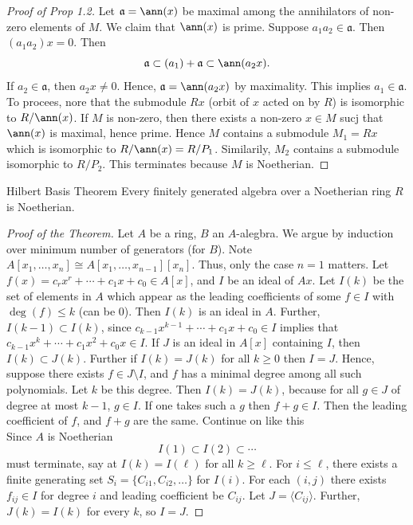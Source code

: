 \documentclass[twoside, openright, fontsize=10pt, headings=big]{scrbook}
\begin{document}
\begin{proof}[Proof of Prop 1.2]
    Let $\mathfrak{a}=\ann(x)$ be maximal among the annihilators of non-zero elements of $M$. We claim that $\ann(x)$ is prime. Suppose $a_1a_2\in\mathfrak{a}$. Then $(a_1a_2)x=0$. Then 
    \[
        \mathfrak{a}\subset(a_1)+\mathfrak{a}\subset \ann(a_2x).
    \]
    If $a_2\in\mathfrak{a}$, then $a_2x\neq0$. Hence, $\mathfrak{a}=\ann(a_2x)$ by maximality. This implies $a_1\in\mathfrak{a}$. To procees, nore that the submodule $Rx$ (orbit of $x$ acted on by $R$) is isomorphic to $R/\ann(x)$. If $M$ is non-zero, then there exists a non-zero $x\in M$ sucj that $\ann(x)$ is maximal, hence prime. Hence $M$ contains a submodule $M_1=Rx$ which is isomorphic to $R/\ann(x)=R/P_1$. Similarily, $M_2$ contains a submodule isomorphic to $R/P_2$. This terminates because $M$ is Noetherian. 
\end{proof}
\begin{theorem}{Hilbert Basis Theorem}{}
    Every finitely generated algebra over a Noetherian ring $R$ is Noetherian. 
\end{theorem}
\begin{proof}[Proof of the Theorem]
    Let $A$ be a ring, $B$ an $A$-alegbra. We argue by induction over minimum number of generators (for $B$). Note $A[x_1,\dots,x_n]\cong A[x_1,\dots,x_{n-1}][x_n]$. Thus, only the case $n=1$ matters. Let $f(x)=c_rx^r+\cdots+c_1x+c_0\in A[x]$, and $I$ be an ideal of $A{x}$. Let $I(k)$ be the set of elements in $A$ which appear as the leading coefficients of some $f\in I$ with $\deg(f)\leq k$ (can be 0). Then $I(k)$ is an ideal in $A$. Further, $I(k-1)\subset I(k)$, since $c_{k-1}x^{k-1}+\cdots+c_1x+c_0\in I$ implies that $c_{k-1}x^{k}+\cdots+c_1x^2+c_0x\in I$. If $J$ is an ideal in $A[x]$ containing $I$, then $I(k)\subset J(k)$. Further if $I(k)=J(k)$ for all $k\geq0$ then $I=J$. Hence, suppose there exists $f\in J\setminus I$, and $f$ has a minimal degree among all such polynomials. Let $k$ be this degree. Then $I(k)=J(k)$, because for all $g\in J$ of degree at most $k-1$, $g\in I$. If one takes such a $g$ then $f+g\in I$. Then the leading coefficient of $f$, and $f+g$ are the same. Continue on like this\\
    Since $A$ is Noetherian
    \[
        I(1)\subset I(2)\subset \cdots
    \]
    must terminate, say at $I(k)=I(\ell)$ for all $k\geq\ell$. For $i\leq\ell$, there exists a finite generating set $S_i=\{C_{i1},C_{i2},\dots\}$ for $I(i)$. For each $(i,j)$ there exists $f_{ij}\in I$ for degree $i$ and leading coefficient be $C_{ij}$. Let $J=\langle C_{ij} \rangle$. Further, $J(k)=I(k)$ for every $k$, so $I=J$. 
\end{proof}
\end{document}
